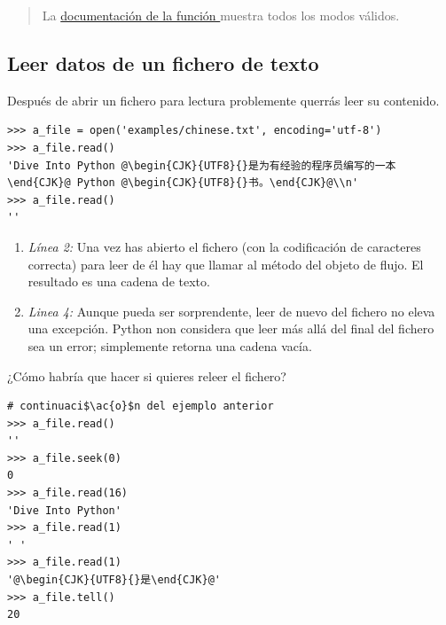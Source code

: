 \begin{quote}
La \href{http://docs.python.org/3.1/library/io.html#module-interface}{documentación de la función } muestra todos los modos válidos.
\end{quote}

\subsection{Leer datos de un fichero de texto}

Después de abrir un fichero para lectura problemente querrás leer su contenido.

\noindent\begin{minipage}{\textwidth}
\begin{lstlisting}[mathescape=True,escapeinside=@@]
>>> a_file = open('examples/chinese.txt', encoding='utf-8')
>>> a_file.read()
'Dive Into Python @\begin{CJK}{UTF8}{}是为有经验的程序员编写的一本\end{CJK}@ Python @\begin{CJK}{UTF8}{}书。\end{CJK}@\\n'
>>> a_file.read()
''
\end{lstlisting}
\end{minipage}

\begin{enumerate}

\item \emph{Línea 2:} Una vez has abierto el fichero (con la codificación de caracteres correcta) para leer de él hay que llamar al método  del objeto de flujo. El resultado es una cadena de texto.

\item \emph{Linea 4:} Aunque pueda ser sorprendente, leer de nuevo del fichero no eleva una excepción. Python non considera que leer más allá del final del fichero sea un error; simplemente retorna una cadena vacía.

\end{enumerate}


¿Cómo habría que hacer si quieres releer el fichero?

\noindent\begin{minipage}{\textwidth}
\begin{lstlisting}[mathescape=True,escapeinside=@@]
# continuaci$\ac{o}$n del ejemplo anterior
>>> a_file.read()
''
>>> a_file.seek(0)
0
>>> a_file.read(16)
'Dive Into Python'
>>> a_file.read(1)
' '
>>> a_file.read(1)
'@\begin{CJK}{UTF8}{}是\end{CJK}@'
>>> a_file.tell()
20
\end{lstlisting}
\end{minipage}


